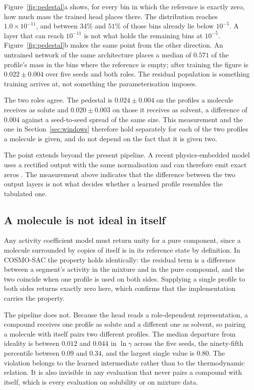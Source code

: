 Figure~\ref{fig:pedestal}a shows, for every bin in which the reference is exactly zero, how much
mass the trained head places there. The distribution reaches $1.0\times10^{-11}$, and between
$34\%$ and $51\%$ of those bins already lie below $10^{-5}$. A layer that can reach $10^{-11}$ is
not what holds the remaining bins at $10^{-5}$. Figure~\ref{fig:pedestal}b makes the same point
from the other direction. An untrained network of the same architecture places a median of $0.571$
of the profile's mass in the bins where the reference is empty; after training the figure is
$0.022\pm0.004$ over five seeds and both roles. The residual population is something training
arrives at, not something the parameterisation imposes.

The two roles agree. The pedestal is $0.024\pm0.004$ on the profiles a molecule receives as solute
and $0.020\pm0.003$ on those it receives as solvent, a difference of $0.004$ against a
seed-to-seed spread of the same size. This measurement and the one in
Section~\ref{sec:windows} therefore hold separately for each of the two profiles a molecule is
given, and do not depend on the fact that it is given two.

The point extends beyond the present pipeline. A recent physics-embedded model uses a rectified
output with the same normalisation and can therefore emit exact zeros \cite{yang2025tennet}. The
measurement above indicates that the difference between the two output layers is not what decides
whether a learned profile resembles the tabulated one.

\subsection{A molecule is not ideal in itself}
\label{sec:refstate}

Any activity coefficient model must return unity for a pure component, since a molecule surrounded
by copies of itself is in its reference state by definition. In COSMO-SAC the property holds
identically: the residual term is a difference between a segment's activity in the mixture and in
the pure compound, and the two coincide when one profile is used on both sides. Supplying a single
profile to both sides returns exactly zero here, which confirms that the implementation carries the
property.

The pipeline does not. Because the head reads a role-dependent representation, a compound receives
one profile as solute and a different one as solvent, so pairing a molecule with itself pairs two
different profiles. The median departure from ideality is between $0.012$ and $0.044$ in
$\ln\gamma$ across the five seeds, the ninety-fifth percentile between $0.09$ and $0.34$, and the
largest single value is $0.80$. The violation belongs to the learned intermediate rather than to
the thermodynamic relation. It is also invisible in any evaluation that never pairs a compound with
itself, which is every evaluation on solubility or on mixture data.


